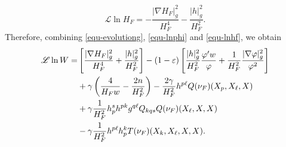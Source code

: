 \documentclass[11pt,reqno]{amsart}
\theoremstyle{definition}
\theoremstyle{remark}
\numberwithin{equation}{section}
\begin{document}
		\begin{equation}
			\mathscr{L} \ln H_F = -\dfrac{|\nabla H_F|^2_{g}}{H_F^4} - \dfrac{|h|_{g}^2}{H_F^2}.
			\label{equ-lnhf}
		\end{equation}
		Therefore, combining \eqref{equ-evolutiong}, \eqref{equ-lnphi} and \eqref{equ-lnhf}, we obtain
		\begin{align}
			\mathscr{L} \ln W =& \left[ \dfrac{|\nabla H_F|^2_{g}}{H_F^4}+\dfrac{|h|_{g}^2}{H_F^2} \right] - (1-\varepsilon) \left[ \dfrac{|h|_{g}^2}{H_F^2}\dfrac{\varphi' w}{\varphi} + \dfrac{1}{H_F^2}\dfrac{|\nabla\varphi|^2_{g}}{\varphi^2}  \right] \notag\\
			&+\gamma\left( \dfrac{4}{H_F w}-\dfrac{2n}{H_F^2} \right) - \dfrac{2\gamma}{H_F^2}h^{p\ell}Q(\nu_F)(X_p,X_{\ell},X)\notag\\
			&+ \gamma\dfrac{1}{H_F^2}h^s_ph^{pk}g^{q\ell}Q_{kqs}Q(\nu_F)(X_{\ell},X,X)\nonumber\\
			&- \gamma\dfrac{1}{H_F^2} h^{p\ell}h^k_p T(\nu_F)(X_k,X_{\ell},X,X).  \label{equ-lnw}
		\end{align}
		
\end{document}
